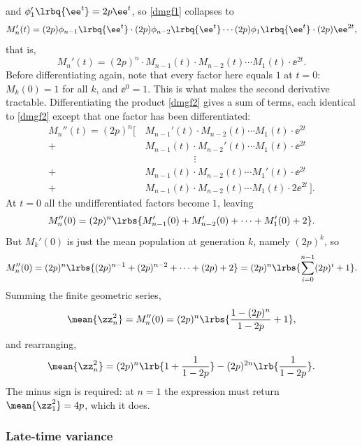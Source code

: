 and $\phi_1'\lrbq{\ee^t} = 2p\ee^t$, so \cref{dmgf1} collapses to
\begin{equation*}
M_n'(t) = (2p)\phi_{n-1}\lrbq{\ee^t}\cdot(2p)\phi_{n-2}\lrbq{\ee^t}\cdots(2p)\phi_{1}\lrbq{\ee^t}\cdot(2p)\ee^{2t},
\end{equation*}
that is,
\begin{equation}
\label{dmgf2}
M_n'(t) = (2p)^n\cdot M_{n-1}(t)\cdot M_{n-2}(t)\cdots M_1(t)\cdot\ee^{2t}.
\end{equation}
Before differentiating again, note that every factor here equals $1$ at $t=0$:
$M_k(0)=1$ for all $k$, and $\ee^{0}=1$. This is what makes the second derivative
tractable. Differentiating the product \cref{dmgf2} gives a sum of terms, each
identical to \cref{dmgf2} except that one factor has been differentiated:
\begin{align*}
M_n''(t) = (2p)^n\bigg[\,&M_{n-1}'(t)\cdot M_{n-2}(t)\cdots M_1(t)\cdot\ee^{2t}\\
+ &M_{n-1}(t)\cdot M_{n-2}'(t)\cdots M_1(t)\cdot\ee^{2t}\\
&\hspace{60pt}\vdots\\
+ &M_{n-1}(t)\cdot M_{n-2}(t)\cdots M_1'(t)\cdot\ee^{2t}\\
+ &M_{n-1}(t)\cdot M_{n-2}(t)\cdots M_1(t)\cdot 2\ee^{2t}\,\bigg].
\end{align*}
At $t=0$ all the undifferentiated factors become $1$, leaving
\begin{equation*}
M_n''(0) = (2p)^n\lrbs{M_{n-1}'(0) + M_{n-2}'(0) + \cdots + M_1'(0) + 2}.
\end{equation*}
But $M_k'(0)$ is just the mean population at generation $k$, namely $(2p)^k$, so
\begin{equation*}
M_n''(0) = (2p)^n\lrbs{(2p)^{n-1} + (2p)^{n-2} + \cdots + (2p) + 2}
= (2p)^n\lrbs{\sum_{i=0}^{n-1}(2p)^i + 1}.
\end{equation*}
Summing the finite geometric series,
\begin{equation*}
\mean{\zz_n^2} = M_n''(0) = (2p)^n\lrbs{\frac{1-(2p)^n}{1-2p} + 1},
\end{equation*}
and rearranging,
\begin{equation}
\label{secondMoment}
\mean{\zz_n^2} = (2p)^n\lrb{1 + \frac{1}{1-2p}} - (2p)^{2n}\lrb{\frac{1}{1-2p}}.
\end{equation}
The minus sign is required: at $n=1$ the expression must return
$\mean{\zz_1^2}=4p$, which it does.

\subsubsection{Late-time variance}


